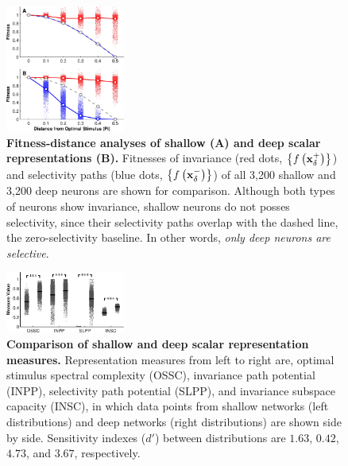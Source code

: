 \documentclass[10pt,twocolumn,letterpaper]{article}
\begin{document}
\begin{figure}
\begin{center}
\includegraphics[width=0.35\textwidth]{Figs/e_fig3a_2-crop-nup-crop.pdf} 
\end{center}
\caption{{\bf Fitness-distance analyses of shallow (A) and deep scalar representations (B).}
Fitnesses of invariance (red dots, \ie $\left\lbrace f\left(\bf{x}^{+}_{\delta}\right) \right\rbrace$) and selectivity paths (blue dots, \ie $\left\lbrace f\left(\bf{x}^{-}_{\delta}\right) \right\rbrace$) of all 3,200 shallow and 3,200 deep neurons are shown for comparison\protect\footnotemark.
Although both types of neurons show invariance, shallow neurons do not posses selectivity, since their selectivity paths overlap with the dashed line, the zero-selectivity baseline.
In other words, \emph{only deep neurons are selective}.
} %
\label{fig:fda}
\end{figure}

\begin{figure}
\begin{center}
\includegraphics[width=0.35\textwidth]{Figs/e_fig23b-crop.pdf} 
\end{center}
\caption{{\bf Comparison of shallow and deep scalar representation measures.}
Representation measures from left to right are, optimal stimulus spectral complexity (OSSC), invariance path potential (INPP), selectivity path potential (SLPP), and invariance subspace capacity (INSC), in which data points from shallow networks (left distributions) and deep networks (right distributions) are shown side by side.
Sensitivity indexes ($d'$) between distributions are $1.63$, $0.42$, $4.73$, and $3.67$, respectively.
}
\label{fig:pair}
\end{figure}
\end{document}
